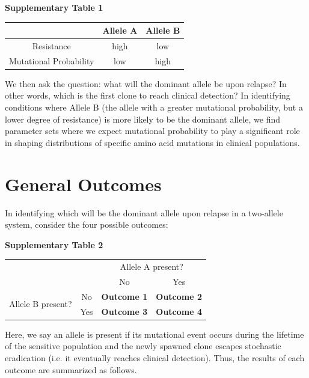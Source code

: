 \documentclass{article}
\begin{document}
\begin{center}
\textbf{Supplementary Table 1}

 \begin{tabular}{||c | c c||} 
 \hline
   & Allele A & Allele B \\ [0.5ex] 
 \hline\hline
 Resistance & high & low \\ 
 \hline
 Mutational Probability & low & high \\ [1ex]
 \hline
\end{tabular}
\end{center}
  We then ask the question: what will the dominant allele be upon relapse?  In other words, which is the first clone to reach clinical detection?  In identifying conditions where Allele B (the allele with a greater mutational probability, but a lower degree of resistance) is more likely to be the dominant allele, we find parameter sets where we expect mutational probability to play a significant role in shaping distributions of specific amino acid mutations in clinical populations.


\section{General Outcomes}

In identifying which will be the dominant allele upon relapse in a two-allele system, consider the four possible outcomes:

\begin{center}
\textbf{Supplementary Table 2}

\begin{tabular}{|c|c|c|c|}
\hline
\multicolumn{2}{|c|}{\multirow{2}{*}{}}  & \multicolumn{2}{c|}{Allele A present?} \\ \cline{3-4} 
\multicolumn{2}{|c|}{}                   & No                 & Yes               \\ \hline
\multirow{2}{*}{Allele B present?} & No  & \textbf{Outcome 1}             & \textbf{Outcome 2}            \\ \cline{2-4} 
                                   & Yes & \textbf{Outcome 3}             & \textbf{Outcome 4}            \\ \hline
\end{tabular}
\end{center}


Here, we say an allele is present if its mutational event occurs during the lifetime of the sensitive population and the newly spawned clone escapes stochastic eradication (i.e. it eventually reaches clinical detection).  Thus, the results of each outcome are summarized as follows.
\end{document}
